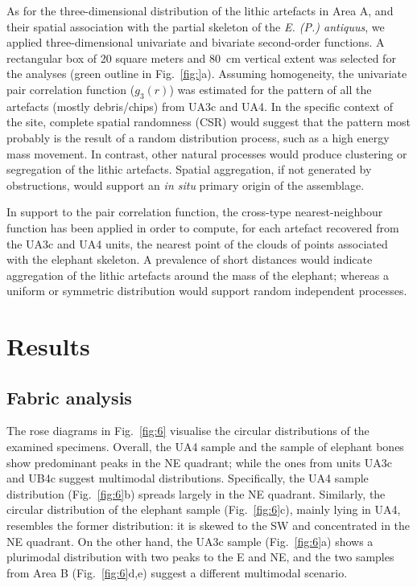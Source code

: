 \documentclass[preprint,authoryear,times]{elsarticle} %
\begin{document}
As for the three-dimensional distribution of the lithic artefacts in Area A, and their spatial association with the partial skeleton of the \emph{E. (P.) antiquus}, we applied three-dimensional univariate and bivariate second-order functions. A rectangular box of 20 square meters and 80~cm vertical extent was selected for the analyses (green outline in Fig.~\ref{fig:}a). Assuming homogeneity, the univariate pair correlation function ($g_3(r)$) was estimated for the pattern of all the artefacts (mostly debris/chips) from UA3c and UA4. In the specific context of the site, complete spatial randomness (CSR) would suggest that the pattern most probably is the result of a random distribution process, such as a high energy mass movement. In contrast, other natural processes would produce clustering or segregation of the lithic artefacts. Spatial aggregation, if not generated by obstructions, would support an \emph{in situ} primary origin of the assemblage.

In support to the pair correlation function, the cross-type nearest-neighbour function has been applied in order to compute, for each artefact recovered from the UA3c and UA4 units, the nearest point of the clouds of points associated with the elephant skeleton. A prevalence of short distances would indicate aggregation of the lithic artefacts around the mass of the elephant; whereas a uniform or symmetric distribution would support random independent processes.

\section{Results}

\subsection{Fabric analysis}


The rose diagrams in Fig.~\ref{fig:6} visualise the circular distributions of the examined specimens. Overall, the UA4 sample and the sample of elephant bones show predominant peaks in the NE quadrant; while the ones from units UA3c and UB4c suggest multimodal distributions. Specifically, the UA4 sample distribution (Fig.~\ref{fig:6}b) spreads largely in the NE quadrant. Similarly, the circular distribution of the elephant sample (Fig.~\ref{fig:6}c), mainly lying in UA4, resembles the former distribution: it is skewed to the SW and concentrated in the NE quadrant. On the other hand, the UA3c sample (Fig.~\ref{fig:6}a) shows a plurimodal distribution with two peaks to the E and NE, and the two samples from Area B (Fig.~\ref{fig:6}d,e) suggest a different multimodal scenario.
\end{document}
